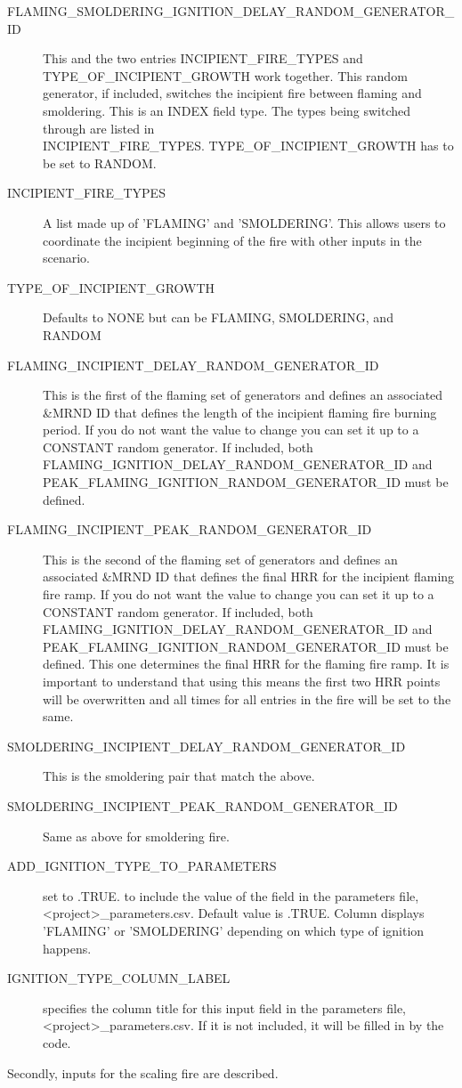 \documentclass[12pt,twoside]{book}
\begin{document}
 \begin{description}
  \item[FLAMING\_SMOLDERING\_IGNITION\_DELAY\_RANDOM\_GENERATOR\_ID] This and the two entries {\ct INCIPIENT\_FIRE\_TYPES} and {\ct TYPE\_OF\_INCIPIENT\_GROWTH} work together. This random generator, if included, switches the incipient fire between flaming and smoldering. This is an {\ct INDEX} field type. The types being switched through are listed in \\
   { \ct INCIPIENT\_FIRE\_TYPES}. {\ct TYPE\_OF\_INCIPIENT\_GROWTH} has to be set to {\ct RANDOM}.
  \item[INCIPIENT\_FIRE\_TYPES] A list made up of 'FLAMING' and 'SMOLDERING'. This allows users to coordinate the incipient beginning of the fire with other inputs in the scenario.
  \item[TYPE\_OF\_INCIPIENT\_GROWTH] Defaults to {\ct NONE} but can be {\ct FLAMING}, {\ct SMOLDERING}, and {\ct RANDOM}
  \item[FLAMING\_INCIPIENT\_DELAY\_RANDOM\_GENERATOR\_ID] This is the first of the flaming set of generators and defines an associated {\ct \&MRND} ID that defines the length of the incipient flaming fire burning period. If you do not want the value to change you can set it up to a {\ct CONSTANT} random generator. If included, both \\
      {\ct FLAMING\_IGNITION\_DELAY\_RANDOM\_GENERATOR\_ID} and \\
      {\ct PEAK\_FLAMING\_IGNITION\_RANDOM\_GENERATOR\_ID} must be defined.
  \item[FLAMING\_INCIPIENT\_PEAK\_RANDOM\_GENERATOR\_ID] This is the second of the flaming set of generators and defines an associated {\ct \&MRND} ID that defines the final HRR for the incipient flaming fire ramp. If you do not want the value to change you can set it up to a {\ct CONSTANT} random generator. If included, both \\
      {\ct FLAMING\_IGNITION\_DELAY\_RANDOM\_GENERATOR\_ID} and \\
      {\ct PEAK\_FLAMING\_IGNITION\_RANDOM\_GENERATOR\_ID} must be defined. This one determines the final HRR for the flaming fire ramp. It is important to understand that using this means the first two HRR points will be overwritten and all times for all entries in the fire will be set to the same.
  \item[SMOLDERING\_INCIPIENT\_DELAY\_RANDOM\_GENERATOR\_ID] This is the smoldering pair that match the above.
  \item[SMOLDERING\_INCIPIENT\_PEAK\_RANDOM\_GENERATOR\_ID] Same as above for smoldering fire.
  \item[ADD\_IGNITION\_TYPE\_TO\_PARAMETERS] set to .TRUE. to include the value of the field in the parameters file, {\ct <project>\_parameters.csv}. Default value is .TRUE. Column displays 'FLAMING' or 'SMOLDERING' depending on which type of ignition happens.
  \item[IGNITION\_TYPE\_COLUMN\_LABEL] specifies the column title for this input field in the parameters file, {\ct <project>\_parameters.csv}. If it is not included, it will be filled in by the code.
 \end{description}
Secondly, inputs for the scaling fire are described.
\end{document}
